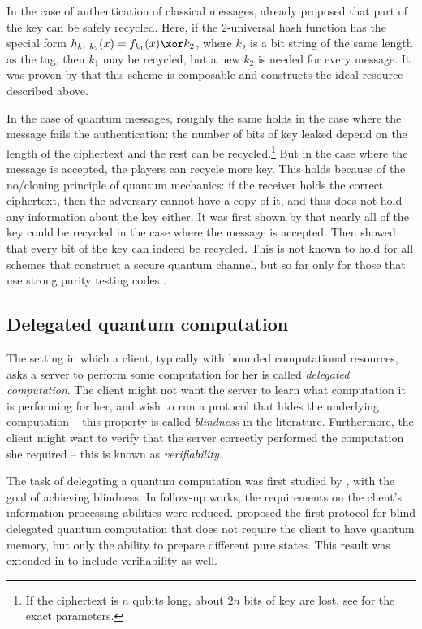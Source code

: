 In the case of authentication of classical messages, \textcite{WC81}
already proposed that part of the key can be safely recycled. Here, if
the $2$-universal hash function has the special form
$h_{k_1,k_2}(x) = {f_{k_1}(x) \xor k_2}$, where $k_2$ is a bit string
of the same length as the tag, then $k_1$ may be recycled, but a new
$k_2$ is needed for every message. It was proven by \textcite{Por14}
that this scheme is composable and constructs the ideal resource
described above.

In the case of quantum messages, roughly the same holds in the case
where the message fails the authentication: the number of bits of key
leaked depend on the length of the ciphertext and the rest can be
recycled.\footnote{If the ciphertext is $n$ qubits long, about $2n$
  bits of key are lost, see \textcite{Por17} for the exact
  parameters.} But in the case where the message is accepted, the
players can recycle more key. This holds because of the no\-/cloning
principle of quantum mechanics: if the receiver holds the correct
ciphertext, then the adversary cannot have a copy of it, and thus does
not hold any information about the key either. It was first shown by
\textcite{HLM11} that nearly all of the key could be recycled in the
case where the message is accepted. Then \textcite{Por17} showed that
every bit of the key can indeed be recycled. This is not known to hold
for all schemes that construct a secure quantum channel, but so far
only for those that use strong purity testing codes \cite{Por17}.

\subsection{Delegated quantum computation}
\label{sec:dqc}

The setting in which a client, typically with bounded computational
resources, asks a server to perform some computation for her is called
\emph{delegated computation}. The client might not want the server to
learn what computation it is performing for her, and wish to run a
protocol that hides the underlying computation \--- this property is
called \emph{blindness} in the literature. Furthermore, the client
might want to verify that the server correctly performed the
computation she required \--- this is known as \emph{verifiability}.

The task of delegating a quantum computation was first studied by
\textcite{Chi05}, with the goal of achieving blindness. In follow-up
works, the requirements on the client's information-processing
abilities were reduced. \textcite{BFK09} proposed the first protocol
for blind delegated quantum computation that does not require the
client to have quantum memory, but only the ability to prepare
different pure states. This result was extended in \textcite{FK17} to
include verifiability as well.


